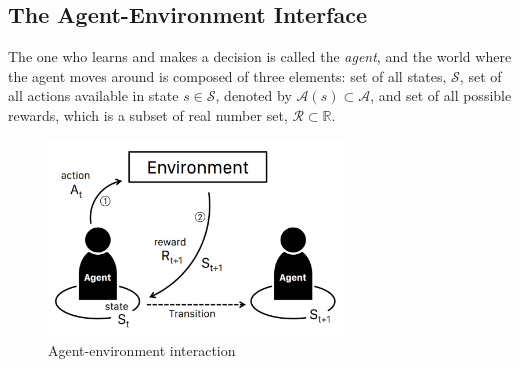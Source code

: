 \subsection{The Agent-Environment Interface}
The one who learns and makes a decision is called the \textit{agent}, and the world where the agent moves around is composed of three elements: set of all states, $\mathcal{S}$, set of all actions available in state $s \in \mathcal{S}$, denoted by $\mathcal{A}(s) \subset \mathcal{A}$, and set of all possible rewards, which is a subset of real number set, $\mathcal{R} \subset \mathbb{R}$.

\begin{figure}[hbt!]
    \centering
    \includegraphics[width=0.7\textwidth]{figures/Reinforcement/interaction.pdf}
    \captionsetup{justification=centering}
    \caption{Agent-environment interaction}
    \label{fig:interaction}
\end{figure}

